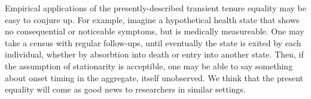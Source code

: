 \documentclass[12pt,oneside,a4paper]{article} %
\theoremstyle{definition}
\begin{document}
Empirical applications of the presently-described transient tenure equality may
be easy to conjure up. For example, imagine a hypothetical health state that
shows no consequential or noticeable symptoms, but is medically measureable. One
may take a census with regular follow-ups, until eventually the state is exited
by each individual, whether by absorbtion into death or entry into another
state. Then, if the assumption of stationarity is acceptible, one may be able to
say something about onset timing in the aggregate, itself unobserved. We think
that the present equality will come as good news to researchers in similar
settings.


  
\end{document}
